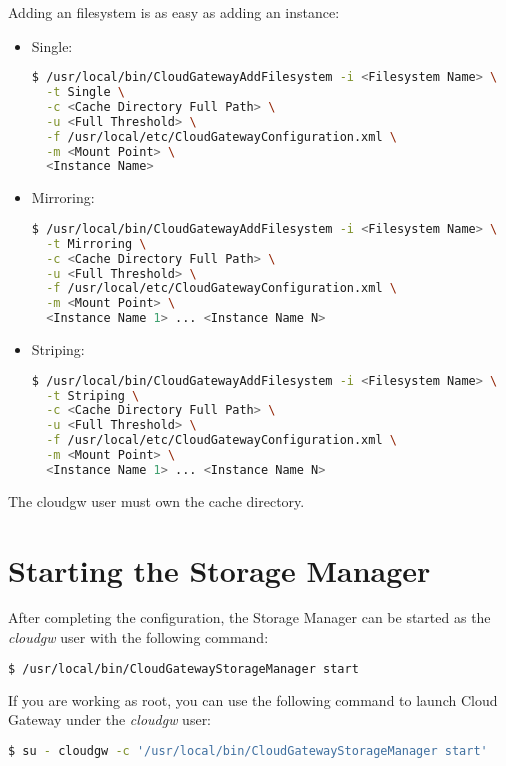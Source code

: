 \documentclass[11pt,fleqn,openany]{book} %
\begin{document}
Adding an {\color{red}filesystem} is as easy as adding an instance:\\

\begin{itemize}

\item Single:
\begin{lstlisting}[language=bash]
$ /usr/local/bin/CloudGatewayAddFilesystem -i <Filesystem Name> \
  -t Single \
  -c <Cache Directory Full Path> \
  -u <Full Threshold> \
  -f /usr/local/etc/CloudGatewayConfiguration.xml \
  -m <Mount Point> \
  <Instance Name>
\end{lstlisting}

\item Mirroring:
\begin{lstlisting}[language=bash]
$ /usr/local/bin/CloudGatewayAddFilesystem -i <Filesystem Name> \
  -t Mirroring \
  -c <Cache Directory Full Path> \
  -u <Full Threshold> \
  -f /usr/local/etc/CloudGatewayConfiguration.xml \
  -m <Mount Point> \
  <Instance Name 1> ... <Instance Name N>
\end{lstlisting}

\item Striping:
\begin{lstlisting}[language=bash]
$ /usr/local/bin/CloudGatewayAddFilesystem -i <Filesystem Name> \
  -t Striping \
  -c <Cache Directory Full Path> \
  -u <Full Threshold> \
  -f /usr/local/etc/CloudGatewayConfiguration.xml \
  -m <Mount Point> \
  <Instance Name 1> ... <Instance Name N>
\end{lstlisting}

\end{itemize}


The cloudgw user must own the cache directory.

\section{Starting the Storage Manager}
\label{sec:starting-the-storage-manager}

After completing the configuration, the Storage Manager can be started as the \textit{cloudgw} user with the following command:\\
\begin{lstlisting}[language=bash]
$ /usr/local/bin/CloudGatewayStorageManager start
\end{lstlisting}

If you are working as root, you can use the following command to launch Cloud Gateway under the \textit{cloudgw} user:\\
\begin{lstlisting}[language=bash]
$ su - cloudgw -c '/usr/local/bin/CloudGatewayStorageManager start'
\end{lstlisting}
\end{document}
